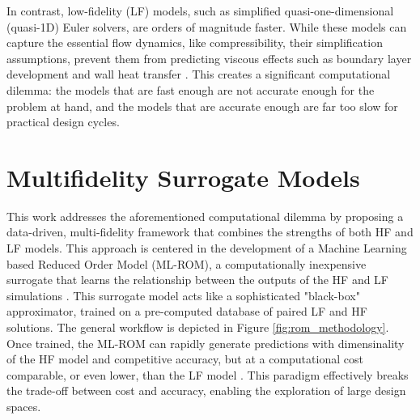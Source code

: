 \documentclass[tg, EN]{ufabcFHZh_tg}
\begin{document}
In contrast, low-fidelity (LF) models, such as simplified quasi-one-dimensional (quasi-1D) Euler solvers, are orders of magnitude faster. While these models can capture the essential flow dynamics, like compressibility, their simplification assumptions, prevent them from predicting viscous effects such as boundary layer development and wall heat transfer \citep{moreira2023}. This creates a significant computational dilemma: the models that are fast enough are not accurate enough for the problem at hand, and the models that are accurate enough are far too slow for practical design cycles.

\section{Multifidelity Surrogate Models}

This work addresses the aforementioned computational dilemma by proposing a data-driven, multi-fidelity framework that combines the strengths of both HF and LF models. This approach is centered in the development of a Machine Learning based Reduced Order Model (ML-ROM), a computationally inexpensive surrogate that learns the relationship between the outputs of the HF and LF simulations \citep{moreira2023, hesthaven2016, benner2015}. This surrogate model acts like a sophisticated "black-box" approximator, trained on a pre-computed database of paired LF and HF solutions. The general workflow is depicted in Figure \ref{fig:rom_methodology}. Once trained, the ML-ROM can rapidly generate predictions with dimensinality of the HF model and competitive accuracy, but at a computational cost comparable, or even lower, than the LF model \citep{yu2019, forrester2008, bekemeyer2025}. This paradigm effectively breaks the trade-off between cost and accuracy, enabling the exploration of large design spaces.
\end{document}
